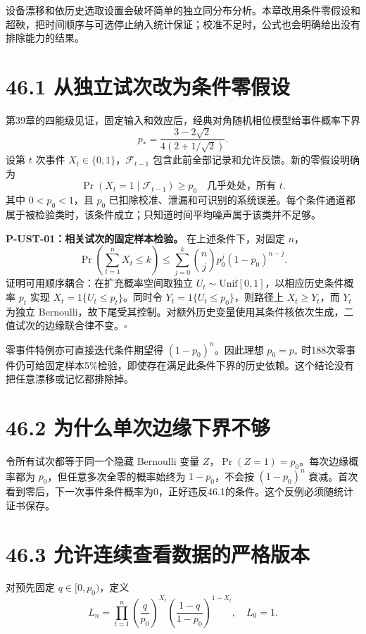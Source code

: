 \documentclass[
  11pt,
  oneside]{book}
\begin{document}
设备漂移和依历史选取设置会破坏简单的独立同分布分析。本章改用条件零假设和超鞅，把时间顺序与可选停止纳入统计保证；校准不足时，公式也会明确给出没有排除能力的结果。

\section{46.1 从独立试次改为条件零假设}

第39章的四能级见证，固定输入和效应后，经典对角随机相位模型给事件概率下界
\[
p_* =\frac{3-2\sqrt2}{4(2+1/\sqrt2)}.
\] 设第 \(t\) 次事件 \(X_t\in\{0,1\}\)，\(\mathcal F_{t-1}\)
包含此前全部记录和允许反馈。新的零假设明确为 \[
\Pr(X_t=1\mid\mathcal F_{t-1})\ge p_0\quad\text{几乎处处，所有 }t.
\] 其中 \(0<p_0<1\)，且 \(p_0\)
已扣除校准、泄漏和可识别的系统误差。每个条件通道都属于被检验类时，该条件成立；只知道时间平均噪声属于该类并不足够。

\protect\hypertarget{p-ust-01}{}{}

\textbf{P-UST-01：相关试次的固定样本检验。} 在上述条件下，对固定 \(n\)，
\[
\Pr\left(\sum_{t=1}^nX_t\le k\right)
\le\sum_{j=0}^k{n\choose j}p_0^j(1-p_0)^{n-j}.
\] 证明可用顺序耦合：在扩充概率空间取独立
\(U_t\sim\mathrm{Unif}[0,1]\)，以相应历史条件概率 \(p_t\) 实现
\(X_t=1\{U_t\le p_t\}\)。同时令 \(Y_t=1\{U_t\le p_0\}\)，则路径上
\(X_t\ge Y_t\)，而 \(Y_t\) 为独立
Bernoulli，故下尾受其控制。对额外历史变量使用其条件核依次生成，二值试次的边缘联合律不变。\(\square\)

零事件特例亦可直接迭代条件期望得 \((1-p_0)^n\)。因此理想 \(p_0=p_*\)
时188次零事件仍可给固定样本5\%检验，即使存在满足此条件下界的历史依赖。这个结论没有把任意漂移或记忆都排除掉。

\section{46.2 为什么单次边缘下界不够}

令所有试次都等于同一个隐藏 Bernoulli 变量
\(Z\)，\(\Pr(Z=1)=p_0\)。每次边缘概率都为
\(p_0\)，但任意多次全零的概率始终为 \(1-p_0\)，不会按 \((1-p_0)^n\)
衰减。首次看到零后，下一次事件条件概率为0，正好违反46.1的条件。这个反例必须随统计证书保存。

\section{46.3 允许连续查看数据的严格版本}

对预先固定 \(q\in[0,p_0)\)，定义 \[
L_n=\prod_{t=1}^n
\left(\frac q{p_0}\right)^{X_t}
\left(\frac{1-q}{1-p_0}\right)^{1-X_t},\quad L_0=1.
\]
\end{document}
